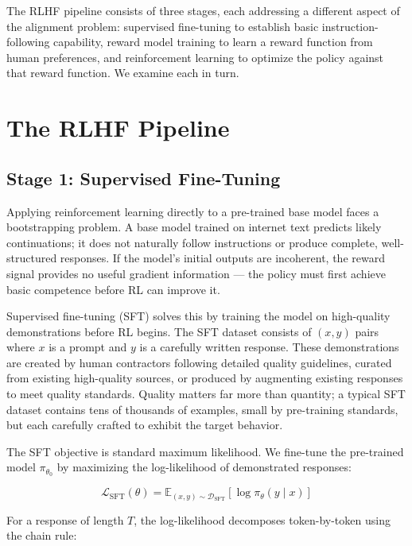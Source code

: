 \documentclass{book}
\begin{document}
The RLHF pipeline consists of three stages, each addressing a different
aspect of the alignment problem: supervised fine-tuning to establish basic
instruction-following capability, reward model training to learn a reward
function from human preferences, and reinforcement learning to optimize the
policy against that reward function. We examine each in turn.

\section{The RLHF Pipeline}
\label{sec:rlhf_pipeline}

\subsection{Stage 1: Supervised Fine-Tuning}
\label{sec:rlhf-sft}

Applying reinforcement learning directly to a pre-trained base model faces
a bootstrapping problem. A base model trained on internet text predicts
likely continuations; it does not naturally follow instructions or produce
complete, well-structured responses. If the model's initial outputs are
incoherent, the reward signal provides no useful gradient information ---
the policy must first achieve basic competence before RL can improve it.

Supervised fine-tuning (SFT) solves this by training the model on
high-quality demonstrations before RL begins. The SFT dataset consists of
$(x, y)$ pairs where $x$ is a prompt and $y$ is a carefully written
response. These demonstrations are created by human contractors following
detailed quality guidelines, curated from existing high-quality sources,
or produced by augmenting existing responses to meet quality standards.
Quality matters far more than quantity; a typical SFT dataset contains
tens of thousands of examples, small by pre-training standards, but each
carefully crafted to exhibit the target behavior.

The SFT objective is standard maximum likelihood. We fine-tune the
pre-trained model $\pi_{\theta_0}$ by maximizing the log-likelihood of
demonstrated responses:

\begin{equation}
\label{eq:sft_objective}
\mathcal{L}_{\text{SFT}}(\theta)
= \mathbb{E}_{(x,y) \sim \mathcal{D}_{\text{SFT}}}
    \left[ \log \pi_\theta(y \mid x) \right]
\end{equation}

For a response of length $T$, the log-likelihood decomposes
token-by-token using the chain rule:
\end{document}
